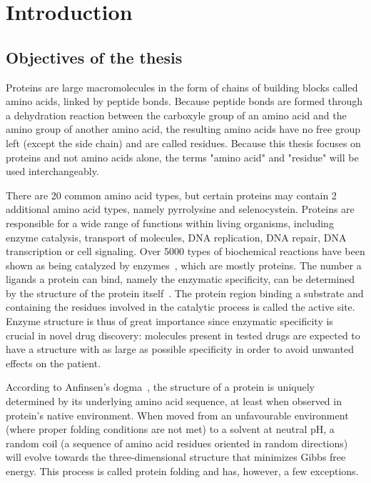 \chapter{Introduction}

\section{Objectives of the thesis}

    \setcounter{page}{1}
    \vspace*{0.5cm}

    Proteins are large macromolecules in the form of chains of building blocks called amino acids,
    linked by peptide bonds. Because peptide bonds are formed through a dehydration reaction between
    the carboxyle group of an amino acid and the amino group of another amino acid,
    the resulting amino acids have no free group left (except the side chain) and are
    called residues. Because this thesis focuses on proteins and not amino acids alone,
    the terms "amino acid" and "residue" will be used interchangeably.

    There are 20 common amino acid types, but certain proteins may contain 2
    additional amino acid types, namely pyrrolysine and selenocystein.
    Proteins are responsible for a wide range of functions within living organisms, including
    enzyme catalysis, transport of molecules, DNA replication, DNA repair, DNA transcription or cell signaling.
    Over 5000 types of biochemical reactions have been shown as being catalyzed by enzymes~\cite{schomburg2012brenda},
    which are mostly proteins. The number a ligands a protein can bind, namely the enzymatic specificity,
    can be determined by the structure of the protein itself~\cite{pi2004determination}.
    The protein region binding a substrate and containing
    the residues involved in the catalytic process is called the active site.
    Enzyme structure is thus of great importance since enzymatic specificity is crucial in novel drug discovery:
    molecules present in tested drugs are expected to have a structure with as large as possible specificity
    in order to avoid unwanted effects on the patient.

    According to Anfinsen's dogma~\cite{anfinsen1973principles}, the structure of a protein is uniquely
    determined by its underlying amino acid sequence,
    at least when observed in protein's native environment.
    When moved from an unfavourable environment (where proper folding conditions are not met)
    to a solvent at neutral pH, a random coil (a sequence of amino acid residues
    oriented in random directions) will evolve towards the three-dimensional structure that minimizes Gibbs free energy.
    This process is called protein folding and has, however, a few exceptions.

